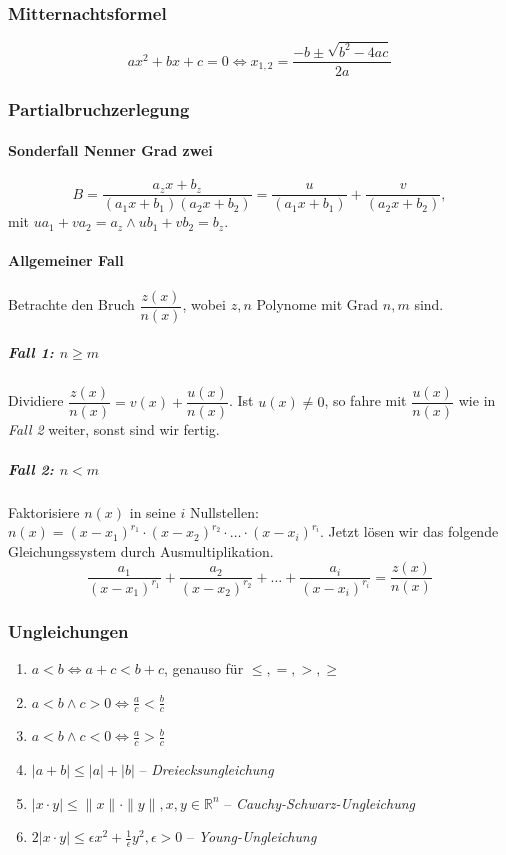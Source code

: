 \documentclass[a4paper, 9pt, DIV=24]{scrartcl}
\begin{document}
\subsubsection{Mitternachtsformel}
\[ ax^2 + bx + c = 0 \iff x_{1,2} = \frac{-b \pm \sqrt{b^2 - 4ac}}{2a} \]

\subsubsection{Partialbruchzerlegung}
\paragraph{Sonderfall Nenner Grad zwei}
\[
 B = \dfrac{a_zx+b_z}{(a_1x+b_1)(a_2x+b_2)} = \dfrac{u}{(a_1x+b_1)} + \dfrac{v}{(a_2x+b_2)},
\]
mit $ua_1 + va_2 = a_z \wedge ub_1 + vb_2 = b_z$.
\paragraph{Allgemeiner Fall}
Betrachte den Bruch $\dfrac{z(x)}{n(x)}$, wobei $z,n$ Polynome mit Grad $n,m$ sind.
\subparagraph{Fall 1: $n \geq m$}
Dividiere $\dfrac{z(x)}{n(x)} = v(x) + \dfrac{u(x)}{n(x)}$.
Ist $u(x) \neq 0$, so fahre mit $\dfrac{u(x)}{n(x)}$ wie in \emph{Fall 2} weiter, sonst sind wir fertig.
\subparagraph{Fall 2: $n < m$}
Faktorisiere $n(x)$ in seine $i$ Nullstellen: $n(x) = (x-x_1)^{r_1} \cdot (x-x_2)^{r_2} \cdot \dots \cdot (x-x_i)^{r_i}.$
Jetzt lösen wir das folgende Gleichungssystem durch Ausmultiplikation.
\[ \frac{a_1}{(x-x_1)^{r_1}} + \frac{a_2}{(x-x_2)^{r_2}} + \dots + \frac{a_i}{(x-x_i)^{r_i}} = \frac{z(x)}{n(x)} \]

\subsubsection{Ungleichungen}
\begin{enumerate}[label={(}\arabic*{)}]
 \item $a < b \iff a + c < b + c$, genauso für $\leq,=,>,\geq$
 \item $a < b \wedge c > 0 \iff \frac{a}{c} < \frac{b}{c}$
 \item $a < b \wedge c < 0 \iff \frac{a}{c} > \frac{b}{c}$
 \item $|a+b| \leq |a| + |b|$ -- \emph{Dreiecksungleichung}
 \item $|x\cdot y| \leq \|x\|\cdot\|y\|, x,y \in \mathbb{R}^n$ -- \emph{Cauchy-Schwarz-Ungleichung}
 \item $2|x\cdot y| \leq \epsilon x^2 + \frac{1}{\epsilon}y^2, \epsilon > 0$ -- \emph{Young-Ungleichung}
\end{enumerate}
\end{document}
